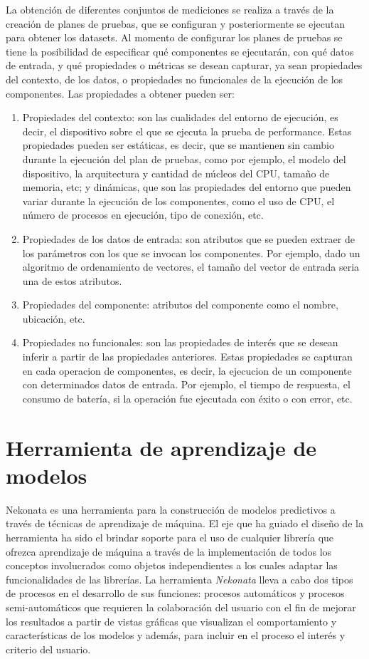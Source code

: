 La obtención de diferentes conjuntos de mediciones se realiza a través
de la creación de planes de pruebas, que se configuran y posteriormente
se ejecutan para obtener los datasets. Al momento de configurar los
planes de pruebas se tiene la posibilidad de especificar qué componentes
se ejecutarán, con qué datos de entrada, y qué propiedades o métricas
se desean capturar, ya sean propiedades del contexto, de los datos,
o propiedades no funcionales de la ejecución de los componentes. Las
propiedades a obtener pueden ser:
\begin{enumerate}
\item Propiedades del contexto: son las cualidades del entorno de ejecución,
es decir, el dispositivo sobre el que se ejecuta la prueba de performance.
Estas propiedades pueden ser estáticas, es decir, que se mantienen
sin cambio durante la ejecución del plan de pruebas, como por ejemplo,
el modelo del dispositivo, la arquitectura y cantidad de núcleos del
CPU, tamaño de memoria, etc; y dinámicas, que son las propiedades
del entorno que pueden variar durante la ejecución de los componentes,
como el uso de CPU, el número de procesos en ejecución, tipo de conexión,
etc. 
\item Propiedades de los datos de entrada: son atributos que se pueden extraer
de los parámetros con los que se invocan los componentes. Por ejemplo,
dado un algoritmo de ordenamiento de vectores, el tamaño del vector
de entrada seria una de estos atributos.
\item Propiedades del componente: atributos del componente como el nombre,
ubicación, etc.
\item Propiedades no funcionales: son las propiedades de interés que se
desean inferir a partir de las propiedades anteriores. Estas propiedades
se capturan en cada operacion de componentes, es decir, la ejecucion
de un componente con determinados datos de entrada. Por ejemplo, el
tiempo de respuesta, el consumo de batería, si la operación fue ejecutada
con éxito o con error, etc.
\end{enumerate}

\section{Herramienta de aprendizaje de modelos\label{subsec:Herramienta-de-entrenamiento}}

Nekonata es una herramienta para la construcción de modelos predictivos
a través de técnicas de aprendizaje de máquina. El eje que ha guiado
el diseño de la herramienta ha sido el brindar soporte para el uso
de cualquier librería que ofrezca aprendizaje de máquina a través
de la implementación de todos los conceptos involucrados como objetos
independientes a los cuales adaptar las funcionalidades de las librerías.
La herramienta \emph{Nekonata} lleva a cabo dos tipos de procesos
en el desarrollo de sus funciones: procesos automáticos y procesos
semi-automáticos que requieren la colaboración del usuario con el
fin de mejorar los resultados a partir de vistas gráficas que visualizan
el comportamiento y características de los modelos y además, para
incluir en el proceso el interés y criterio del usuario. 


